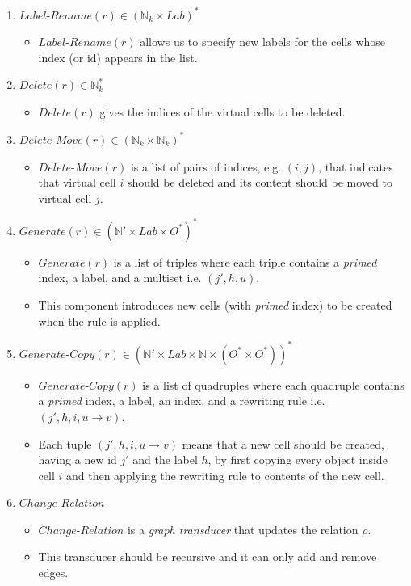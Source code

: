 \documentclass{article}
\newcommand{\mn}{\text{-}}
\begin{document}
\begin{appendices}
\begin{enumerate}
   \item $Label\mn Rename(r) \in (\mathbb{N}_k \times Lab)^*$
         \begin{itemize}
         \item $Label\mn Rename(r)$ allows us to specify new labels for the cells whose index (or id) appears in the list.
         \end{itemize}
   \item $Delete(r) \in \mathbb{N}_k^*$
         \begin{itemize}
         \item $Delete(r)$ gives the indices of the virtual cells to be deleted.
         \end{itemize}
   \item $Delete\mn Move(r) \in (\mathbb{N}_k \times \mathbb{N}_k)^*$
         \begin{itemize}
         \item $Delete\mn Move(r)$ is a list of pairs of indices, e.g. $(i,j)$, that indicates that virtual cell $i$ should be deleted and its content should be moved to virtual cell $j$.
         \end{itemize}
   \item $Generate(r) \in (\mathbb{N}' \times Lab \times O^*)^*$
         \begin{itemize}
         \item $Generate(r)$ is a list of triples where each triple contains a \textit{primed} index, a label, and a multiset i.e. $(j', h, u)$.  
         \item This component introduces new cells (with \textit{primed} index) to be created when the rule is applied.
         \end{itemize}
   \item $Generate\mn Copy(r) \in (\mathbb{N}' \times Lab \times \mathbb{N} \times (O^* \times  O^*))^*$
         \begin{itemize}
         \item $Generate\mn Copy(r)$ is a list of quadruples where each quadruple contains a \textit{primed} index, a label, an index, and a rewriting rule i.e. $(j', h, i, u \rightarrow v)$.  
         \item Each tuple $(j', h, i, u \rightarrow v)$ means that a new cell should be created, having a new id $j'$ and the label $h$, by first copying every object inside cell $i$ and then applying the rewriting rule to contents of the new cell.
         \end{itemize}
   \item $Change\mn Relation$
         \begin{itemize}
         \item $Change\mn Relation$ is a \textit{graph transducer} that updates the relation $\rho$.
         \item This transducer should be recursive and it can only add and remove edges.
         \end{itemize}
\end{enumerate}


\end{appendices}
\end{document}
